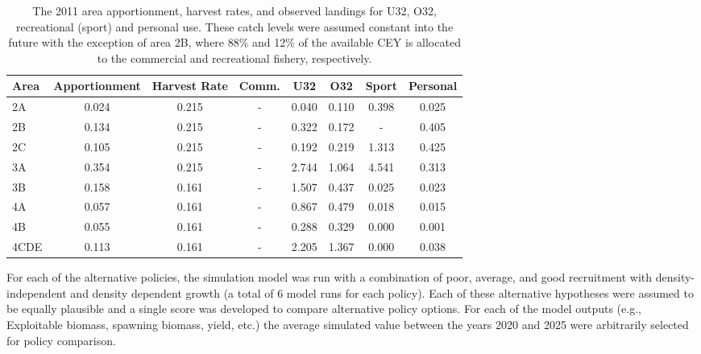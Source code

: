 \begin{table}
	\caption{The 2011 area apportionment, harvest rates, and observed landings for U32, O32, recreational (sport) and personal use.  These catch levels were assumed constant into the future with the exception of area 2B, where 88\% and 12\% of the available CEY is allocated to the commercial and recreational fishery, respectively.}
	\label{table:2011otherLandings}
	\begin{center}
\begin{tabular}{l|cc | ccccc}
\hline
Area &  Apportionment & Harvest Rate &    Comm. & U32&  O32 & Sport & Personal\\
\hline
2A   & 0.024 & 0.215 &   - &   0.040 & 0.110 & 0.398 & 0.025\\
2B   & 0.134 & 0.215 &   - &   0.322 & 0.172 & -     & 0.405\\
2C   & 0.105 & 0.215 &   - &   0.192 & 0.219 & 1.313 & 0.425\\
3A   & 0.354 & 0.215 &   - &   2.744 & 1.064 & 4.541 & 0.313\\
3B   & 0.158 & 0.161 &   - &   1.507 & 0.437 & 0.025 & 0.023\\
4A   & 0.057 & 0.161 &   - &   0.867 & 0.479 & 0.018 & 0.015\\
4B   & 0.055 & 0.161 &   - &   0.288 & 0.329 & 0.000 & 0.001\\
4CDE & 0.113 & 0.161 &   - &   2.205 & 1.367 & 0.000 & 0.038\\
\hline
\end{tabular}

	\end{center}
\end{table}

For each of the alternative policies, the simulation model was run with a combination of poor, average, and good recruitment with density-independent and density dependent growth (a total of 6 model runs for each policy).  Each of these alternative hypotheses were assumed to be equally plausible and a single score was developed to compare alternative policy options.  For each of the model outputs (e.g., Exploitable biomass, spawning biomass, yield, etc.)  the average simulated value between the years 2020 and 2025 were arbitrarily selected for policy comparison.



































